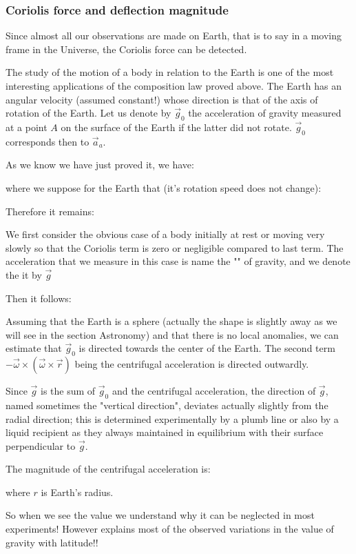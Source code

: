 	\subsubsection{Coriolis force and deflection magnitude}
	Since almost all our observations are made on Earth, that is to say in a moving frame in the Universe, the Coriolis force can be detected.

	The study of the motion of a body in relation to the Earth is one of the most interesting applications of the composition law proved above. The Earth has an angular velocity (assumed constant!) whose direction is that of the axis of rotation of the Earth. Let us denote by $\vec{g}_0$ the acceleration of gravity measured at a point $A$ on the surface of the Earth if the latter did not rotate. $\vec{g}_0$ corresponds then to $\vec{a}_a$. 

	As we know we have just proved it, we have:
	
	
	where we suppose for the Earth that (it's rotation speed does not change):
	
	Therefore it remains:
	
	We first consider the obvious case of a body initially at rest or moving very slowly so that the Coriolis term is zero or negligible compared to last term. The acceleration that we measure in this case is name the "" of gravity, and we denote the it by $\vec{g}$

	Then it follows:
	
	Assuming that the Earth is a sphere (actually the shape is slightly away as we will see in the section Astronomy) and that there is no local anomalies, we can estimate that $\vec{g}_0$ is directed towards the center of the Earth. The second term $-\vec{\omega}\times(\vec{\omega}\times\vec{r})$ being the centrifugal acceleration is directed outwardly.

	Since $\vec{g}$ is the sum of $\vec{g}_0$ and the centrifugal acceleration, the direction of $\vec{g}$, named sometimes the "vertical direction", deviates actually slightly from the radial direction; this is determined experimentally by a plumb line or also by a liquid recipient as they always maintained in equilibrium with their surface perpendicular to $\vec{g}$.
	
	The magnitude of the centrifugal acceleration is:
	
	where $r$ is Earth's radius.
	
	So when we see the value we understand why it can be neglected in most experiments! However explains most of the observed variations in the value of gravity with latitude!!
	
